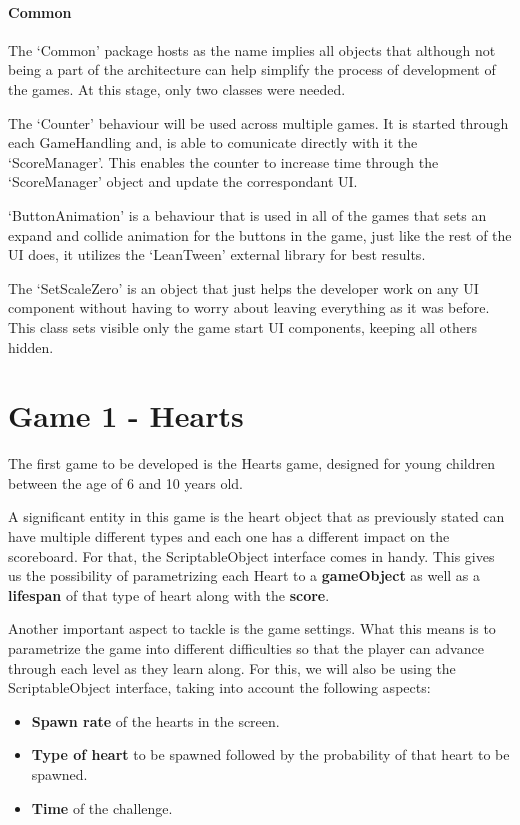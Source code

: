\paragraph{Common}

The `Common' package hosts as the name implies all objects that although not being a part of the architecture can help simplify the process of development of the games. At this stage, only two classes were needed. 

The `Counter' behaviour will be used across multiple games. It is started through each GameHandling and, is able to comunicate directly with it the `ScoreManager'. This enables the counter to increase time through the `ScoreManager' object and update the correspondant UI.

`ButtonAnimation' is a behaviour that is used in all of the games that sets an expand and collide animation for the buttons in the game, just like the rest of the UI does, it utilizes the `LeanTween' external library for best results.

The `SetScaleZero' is an object that just helps the developer work on any UI component without having to worry about leaving everything as it was before. This class sets visible only the game start UI components, keeping all others hidden.

\newpage
\section{Game 1 - Hearts}

The first game to be developed is the Hearts game, designed for young children between the age of 6 and 10 years old.


A significant entity in this game is the heart object that as previously stated can have multiple different types and each one has a different impact on the scoreboard. For that, the ScriptableObject interface \cite{unityDocScriptableObj} comes in handy. This gives us the possibility of parametrizing each Heart to a \textbf{gameObject} as well as a \textbf{lifespan} of that type of heart along with the \textbf{score}.

Another important aspect to tackle is the game settings. What this means is to parametrize the game into different difficulties so that the player can advance through each level as they learn along.
For this, we will also be using the ScriptableObject interface, taking into account the following aspects:

\begin{itemize}
    \item \textbf{Spawn rate} of the hearts in the screen.
    \item \textbf{Type of heart} to be spawned followed by the probability of that heart to be spawned.
    \item \textbf{Time} of the challenge.
\end{itemize}

